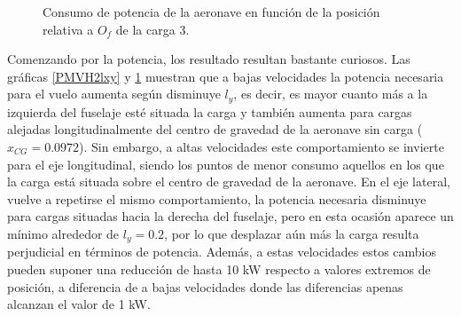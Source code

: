 \begin{figure}
	\centering
	\caption{Consumo de potencia de la aeronave en función de la posición relativa a $O_f$ de la carga 3.}
	\label{PMVH3lxy}
\end{figure}

Comenzando por la potencia, los resultado resultan bastante curiosos. Las gráficas \ref{PMVH2lxy} y \ref{PMVH3lxy} muestran que a bajas velocidades la potencia necesaria para el vuelo aumenta según disminuye $l_y$, es decir, es mayor cuanto más a la izquierda del fuselaje esté situada la carga y también aumenta para cargas alejadas longitudinalmente del centro de gravedad de la aeronave sin carga ($x_{CG}=0.0972$). Sin embargo, a altas velocidades este comportamiento se invierte para el eje longitudinal, siendo los puntos de menor consumo aquellos en los que la carga está situada sobre el centro de gravedad de la aeronave. En el eje lateral, vuelve a repetirse el mismo comportamiento, la potencia necesaria disminuye para cargas situadas hacia la derecha del fuselaje, pero en esta ocasión aparece un mínimo alrededor de $l_y=0.2$, por lo que desplazar aún más la carga resulta perjudicial en términos de potencia. Además, a estas velocidades estos cambios pueden suponer una reducción de hasta 10 kW respecto a valores extremos de posición, a diferencia de a bajas velocidades donde las diferencias apenas alcanzan el valor de 1 kW.

